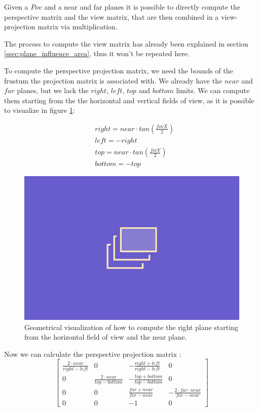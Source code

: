 \documentclass{PoliMi_MasterThesis}
\begin{document}
Given a $Pov$ and a near and far planes it is possible to directly compute the perspective matrix and the view matrix, that are then combined in a view-projection matrix via multiplication.

The process to compute the view matrix has already been explained in section \ref{ssec:plane_influence_area}, thus it won't be repeated here.

To compute the perspective projection matrix, we need the bounds of the frustum the projection matrix is associated with. We already have the $near$ and $far$ planes, but we lack the $right$, $left$, $top$ and $bottom$ limits. We can compute them starting from the the horizontal and vertical fields of view, as it is possible to visualize in figure \ref{fig:fov_to_right}:

\begin{align*}
	&right = near \cdot tan(\frac{fovX}{2}) \\
	&left = -right \\
	&top = near \cdot tan(\frac{fovY}{2}) \\
	&bottom = -top
\end{align*}

\begin{figure}[H]
	\centering
	\includegraphics[width=\textwidth*\real{0.6}]{Images/TODO.png}
	\caption{Geometrical visualization of how to compute the right plane starting from the horizontal field of view and the near plane.}
	\label{fig:fov_to_right}
\end{figure}

Now we can calculate the perspective projection matrix \cite{TODO}:
\begin{equation}
	\begin{bmatrix}
		\frac{2\cdot near}{right-left} & 0 & -\frac{right+left}{right-left} & 0 \\
		0 & \frac{2\cdot near}{top-bottom} & -\frac{top+bottom}{top-bottom} & 0 \\
		0 & 0 & \frac{far+near}{far-near} & -\frac{2\cdot far \cdot near}{far-near} \\
		0 & 0 & -1 & 0
	\end{bmatrix}
\end{equation}
\end{document}
